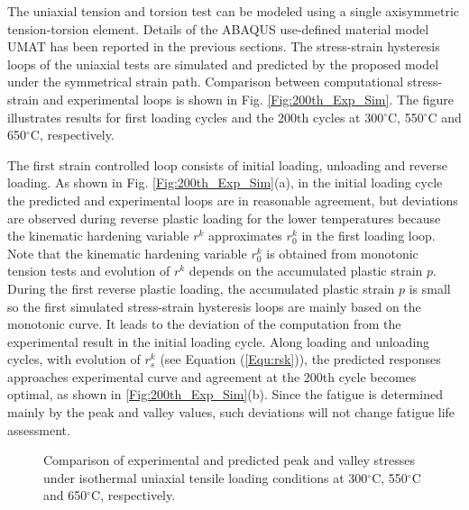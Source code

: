 \documentclass[preprint,5p,twocolumn,11pt,sort&compress]{elsarticle}
\begin{document}
\begin{figure*}
\caption{Comparison of the stress-strain hysteresis loops between experiments and computations  under isothermal uniaxial tensile loading conditions at 300$^{\circ}$C, 550$^{\circ}$C and 650$^{\circ}$C, respectively. (a) The first loading cycle. (b) The 200th cycle.}
\label{Fig:200th_Exp_Sim}
\end{figure*}

The uniaxial tension and torsion test can be modeled using a single axisymmetric tension-torsion element.
Details of the ABAQUS use-defined material model UMAT has been reported in the previous sections.
The stress-strain hysteresis loops of the uniaxial tests are simulated and predicted by the proposed model under the symmetrical strain path.
Comparison between  computational stress-strain and  experimental loops is shown in Fig. \ref{Fig:200th_Exp_Sim}.
The figure illustrates results for first loading cycles and the 200th cycles at 300$^{\circ}$C, 550$^{\circ}$C and 650$^{\circ}$C, respectively.

The first strain controlled loop consists of initial loading, unloading and reverse loading.
As shown in Fig. \ref{Fig:200th_Exp_Sim}(a), in the initial loading cycle the predicted and experimental loops are in reasonable agreement, but deviations are observed during reverse plastic loading for the lower temperatures because the kinematic hardening variable $r^k$ approximates ${r_0^k}$ in the first loading loop. 
Note that the kinematic hardening variable ${r_0^k}$ is obtained from monotonic tension tests and evolution of $r^k$ depends on the accumulated plastic strain $p$. 
During the first reverse plastic loading, the accumulated plastic strain $p$ is small so the first simulated stress-strain hysteresis loops are mainly based on the monotonic curve. It leads to the deviation of the computation from the experimental result in the initial loading cycle.
Along loading and unloading cycles, with evolution of $r_s^k$ (see Equation (\ref{Equ:rsk})), the predicted responses approaches experimental curve and agreement at the 200th cycle becomes optimal, as shown in \ref{Fig:200th_Exp_Sim}(b). Since the fatigue is determined mainly by the peak and valley values, such deviations will not change fatigue life assessment.


\begin{figure}
\caption{Comparison of experimental and predicted peak and valley stresses under isothermal uniaxial tensile loading conditions at 300$^{\circ}$C, 550$^{\circ}$C and 650$^{\circ}$C, respectively.}
\label{Fig:Compare_PACC-PV_stress_temperature}
\end{figure}
\end{document}
